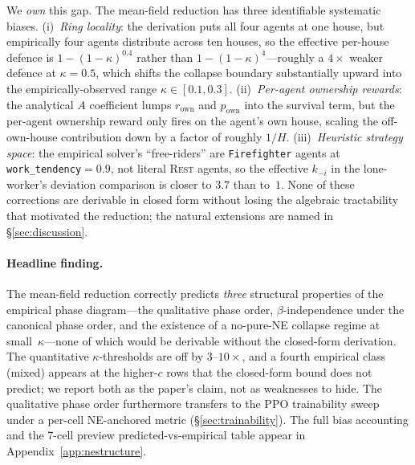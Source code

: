 \documentclass{anvil-paper}
\begin{document}
We \emph{own} this gap. The mean-field reduction has three identifiable
systematic biases. (i)~\emph{Ring locality}: the derivation puts all four
agents at one house, but empirically four agents distribute across ten
houses, so the effective per-house defence is $1{-}(1{-}\kappa)^{0.4}$ rather
than $1{-}(1{-}\kappa)^4$---roughly a $4\times$ weaker defence at $\kappa{=}0.5$,
which shifts the collapse boundary substantially upward into the
empirically-observed range $\kappa\in[0.1,0.3]$. (ii)~\emph{Per-agent
ownership rewards}: the analytical $A$ coefficient lumps $r_{\text{own}}$
and $p_{\text{own}}$ into the survival term, but the per-agent ownership
reward only fires on the agent's own house, scaling the off-own-house
contribution down by a factor of roughly $1/H$. (iii)~\emph{Heuristic
strategy space}: the empirical solver's ``free-riders'' are
\texttt{Firefighter} agents at \texttt{work\_tendency}${=}0.9$, not literal
\textsc{Rest} agents, so the effective $k_{-i}$ in the lone-worker's
deviation comparison is closer to $3.7$ than to~$1$. None of these
corrections are derivable in closed form without losing the algebraic
tractability that motivated the reduction; the natural extensions are
named in \S\ref{sec:discussion}.

\paragraph{Headline finding.}
The mean-field reduction correctly predicts \emph{three} structural
properties of the empirical phase diagram---the qualitative phase order,
$\beta$-independence under the canonical phase order, and the existence of a
no-pure-NE collapse regime at small~$\kappa$---none of which would be
derivable without the closed-form derivation. The quantitative
$\kappa$-thresholds are off by $3$--$10\times$, and a fourth empirical class
(\textsf{mixed}) appears at the higher-$c$ rows that the closed-form bound
does not predict; we report both as the paper's claim, not as weaknesses to
hide. The qualitative phase order furthermore transfers to the PPO
trainability sweep under a per-cell NE-anchored metric
(\S\ref{sec:trainability}). The full bias accounting and the 7-cell
preview predicted-vs-empirical table appear in Appendix~\ref{app:nestructure}.
\end{document}
